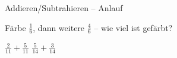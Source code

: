 \setcounter{aufgabe}{0}

\begin{aufgabe}{Addieren/Subtrahieren – Anlauf}
\begin{teile}
\teil Färbe $\frac{1}{6}$, dann weitere $\frac{4}{6}$ – wie viel ist gefärbt?

\leerfeld
\teil $\frac{2}{11} + \frac{5}{11}$
\teil $\frac{5}{14} + \frac{3}{14}$
\end{teile}
\end{aufgabe}

